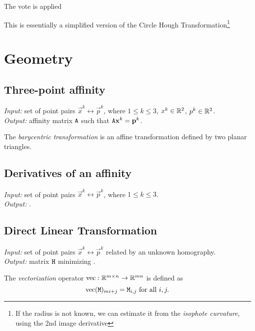 The vote is applied 

This is essentially a simplified version of the Circle Hough Transformation\footnote{
If the radius is not known, we can estimate it from the \textit{isophote curvature}, using the 2nd image derivative
\todo{\dots}
}
\todo{\dots}

\section{Geometry}

\subsection{Three-point affinity}

\textit{Input:} set of point pairs $\vec x^k \leftrightarrow \vec p^k$, where $1 \leq k \leq 3$, $x^k \in \mathbb{R}^2$, $p^k \in \mathbb{R}^2$.\\
\textit{Output:} affinity matrix $\mathtt{A}$ such that $\mathtt{A} \mathbf{x}^k = \mathbf{p}^k$.\\


The \textit{barycentric transformation} is an affine transformation defined by two planar triangles.

\subsection{Derivatives of an affinity}

\textit{Input:} set of point pairs $\vec x^k \leftrightarrow \vec p^k$, where $1 \leq k \leq 3$.\\
\textit{Output:} .\\


\subsection{Direct Linear Transformation}

\textit{Input:} set of point pairs $\vec x^k \leftrightarrow \vec p^k$ related by an unknown homography.\\
\textit{Output:} matrix $\mathtt{H}$ minimizing .\\

\begin{definition}
The \textit{vectorization} operator $\mathrm{vec} : \mathbb{R}^{m \times n} \to \mathbb{R}^{mn}$ is defined as
$$\mathrm{vec}(\mathtt{M})_{m i + j} = \mathtt{M}_{i,j} \textrm{ for all } i, j.$$
\end{definition}

